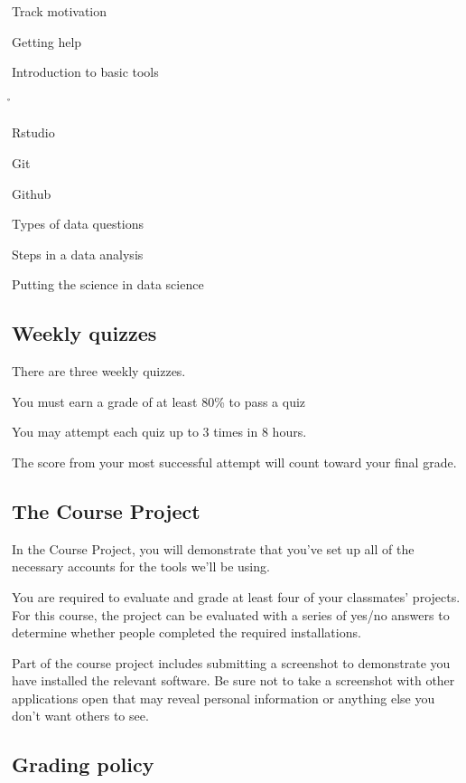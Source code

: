 \begin{nitemize}
\item    Track motivation
\item    Getting help
\item    Introduction to basic tools
\item    \r{}
\item    Rstudio
\item    Git
\item    Github
\item    Types of data questions
\item    Steps in a data analysis
\item    Putting the science in data science
\end{nitemize}


\subsection*{Weekly quizzes}

\begin{nitemize}
\item    There are three weekly quizzes.
\item    You must earn a grade of at least 80\% to pass a quiz
\item    You may attempt each quiz up to 3 times in 8 hours.
\item    The score from your most successful attempt will count toward your final grade.
\end{nitemize}


\subsection*{The Course Project}

In the Course Project, you will demonstrate that you've set up all of the necessary accounts for the tools we'll be using.

You are required to evaluate and grade at least four of your classmates' projects. For this course, the project can be evaluated with a series of yes/no answers to determine whether people completed the required installations.

Part of the course project includes submitting a screenshot to demonstrate you have installed the relevant software. Be sure not to take a screenshot with other applications open that may reveal personal information or anything else you don't want others to see.


\subsection*{Grading policy}


